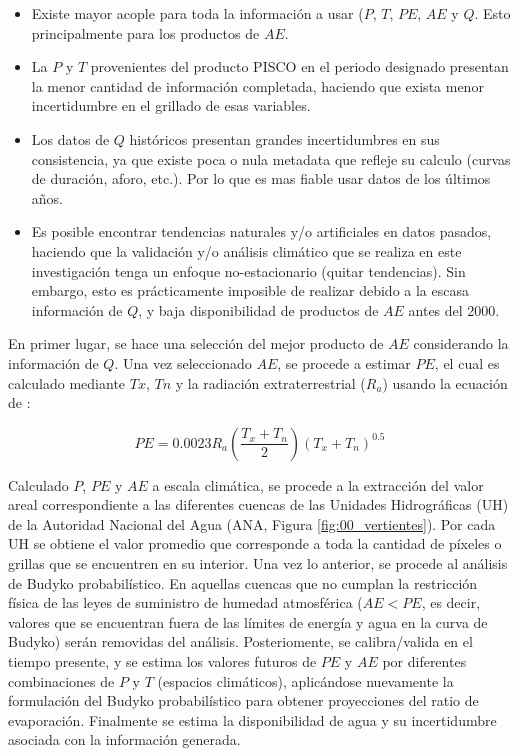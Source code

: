 \documentclass[12pt]{article}
\begin{document}
\begin{itemize}

	\item Existe mayor acople para toda la información a usar ($P$, $T$, $PE$, $AE$ y $Q$. Esto principalmente para los productos de $AE$.
	
	\item La $P$ y $T$ provenientes del producto PISCO en el periodo designado presentan la menor cantidad de información completada, haciendo que exista menor incertidumbre en el grillado de esas variables.
	
	\item Los datos de $Q$ históricos presentan grandes incertidumbres en sus consistencia, ya que existe poca o nula metadata que refleje su calculo (curvas de duración, aforo, etc.). Por lo que es mas fiable usar datos de los últimos años.
	
	\item Es posible encontrar tendencias naturales y/o artificiales en datos pasados, haciendo que la validación y/o análisis climático que se realiza en este investigación tenga un enfoque no-estacionario (quitar tendencias). Sin embargo, esto es prácticamente imposible de realizar debido a la escasa información de $Q$, y baja disponibilidad de productos de $AE$ antes del 2000.
	
\end{itemize}

En primer lugar, se hace una selección del mejor producto de $AE$ considerando la información de $Q$. Una vez seleccionado $AE$, se procede a estimar $PE$, el cual es calculado mediante $Tx$, $Tn$ y la radiación extraterrestrial ($R_{a}$) usando la ecuación de \citet{Hargreaves1985}:

\begin{equation}
PE = 0.0023R_{a}\left ( \frac{T_{x}+T_{n}}{2} \right )\left ( T_{x}+T_{n} \right )^{0.5}
\end{equation}

Calculado $P$, $PE$ y $AE$ a escala climática, se procede a la extracción del valor areal correspondiente a las diferentes cuencas de las Unidades Hidrográficas (UH) de la Autoridad Nacional del Agua (ANA, Figura \ref{fig:00_vertientes}). Por cada UH se obtiene el valor promedio que corresponde a toda la cantidad de píxeles o grillas que se encuentren en su interior. Una vez lo anterior, se procede al análisis de Budyko probabilístico. En aquellas cuencas que no cumplan la restricción física de las leyes de suministro de humedad atmosférica ($AE < PE$, es decir, valores que se encuentran fuera de las límites de energía y agua en la curva de Budyko) serán removidas del análisis. Posteriomente, se calibra/valida en el tiempo presente, y se estima los valores futuros de $PE$ y $AE$ por diferentes combinaciones de $P$ y $T$ (espacios climáticos), aplicándose nuevamente la formulación del Budyko probabilístico para obtener proyecciones del ratio de evaporación. Finalmente se estima la disponibilidad de agua y su incertidumbre asociada con la información generada.
\end{document}
